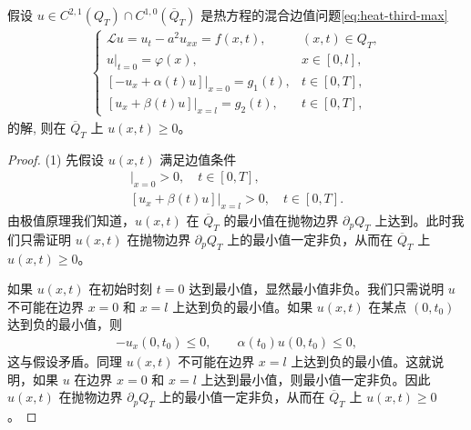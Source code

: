 \documentclass[../../main.tex]{subfiles}%
\begin{document}
\begin{lemma}\label{lemma:热方程的混合边值问题引理}
假设 $u\in C^{2,1}(Q_T)\cap C^{1,0}(\overline{Q}_T)$ 是热方程的混合边值问题\eqref{eq:heat-third-max}
\begin{align}
\begin{cases}
\mathcal{L}u=u_t-a^2u_{xx}=f(x,t), & (x,t)\in Q_T,\\
u|_{t=0}=\varphi(x), & x\in[0,l],\\
[-u_x+\alpha(t)u]|_{x=0}=g_1(t), & t\in[0,T],\\
[u_x+\beta(t)u]|_{x=l}=g_2(t), & t\in[0,T],
\end{cases} \label{eq:heat-third-max}
\end{align}
的解,
则在 $\overline{Q}_T$ 上 $u(x,t)\geqslant 0$。
\end{lemma}
\begin{proof}

(1) 先假设 $u(x,t)$ 满足边值条件
\begin{align*}
[-u_x+\alpha(t)u]|_{x=0}>0,\quad t\in[0,T],\\
[u_x+\beta(t)u]|_{x=l}>0,\quad t\in[0,T].
\end{align*}
由极值原理我们知道，$u(x,t)$ 在 $\overline{Q}_T$ 的最小值在抛物边界 $\partial_p Q_T$ 上达到。此时我们只需证明 $u(x,t)$ 在抛物边界 $\partial_p Q_T$ 上的最小值一定非负，从而在 $\overline{Q}_T$ 上 $u(x,t)\geqslant 0$。

如果 $u(x,t)$ 在初始时刻 $t=0$ 达到最小值，显然最小值非负。我们只需说明 $u$ 不可能在边界 $x=0$ 和 $x=l$ 上达到负的最小值。如果 $u(x,t)$ 在某点 $(0,t_0)$ 达到负的最小值，则
\begin{align*}
-u_x(0,t_0)\leqslant 0,\qquad \alpha(t_0)u(0,t_0)\leqslant 0,
\end{align*}
这与假设矛盾。同理 $u(x,t)$ 不可能在边界 $x=l$ 上达到负的最小值。这就说明，如果 $u$ 在边界 $x=0$ 和 $x=l$ 上达到最小值，则最小值一定非负。因此 $u(x,t)$ 在抛物边界 $\partial_p Q_T$ 上的最小值一定非负，从而在 $\overline{Q}_T$ 上 $u(x,t)\geqslant 0$。


\end{proof}
\end{document}
